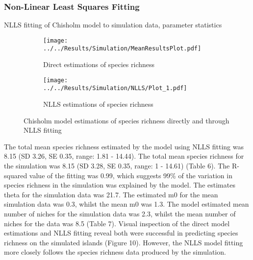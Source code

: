 \documentclass{article}
\begin{document}
\subsubsection{Non-Linear Least Squares Fitting}      
   
\begin{table}[h!]
\caption{NLLS fitting of Chisholm model to simulation data, parameter statistics}
\centering
{}
   \end{table}\bigskip

\begin{figure}
 \centering
 \begin{subfigure}[b]{0.4\linewidth}
  \texttt{[image: ../../Results/Simulation/MeanResultsPlot.pdf]}
   \caption{Direct estimations of species richness}
  \end{subfigure}
  \begin{subfigure}[b]{0.4\linewidth}
   \texttt{[image: ../../Results/Simulation/NLLS/Plot\_1.pdf]}
    \caption{NLLS estimations of species richness}
  \end{subfigure}
  \caption{Chisholm model estimations of species richness directly and through NLLS fitting}
  \label{fig:modelfitting}
\end{figure}

The total mean species richness estimated by the model using NLLS fitting was 8.15 (SD 3.26, SE 0.35, range: 1.81 - 14.44). The total mean species richness for the simulation was 8.15 (SD 3.28, SE 0.35, range: 1 - 14.61) (Table 6). The R-squared value of the fitting was 0.99, which suggests 99\% of the variation in species richness in the simulation was explained by the model. 
The estimates theta for the simulation data was 21.7. The estimated m0 for the mean simulation data was 0.3, whilst the mean m0 was 1.3. The model estimated mean number of niches for the simulation data was 2.3, whilst the mean number of niches for the data was 8.5 (Table 7).
  Visual inspection of the direct model estimations and NLLS fitting reveal both were successful in predicting species richness on the simulated islands (Figure 10). However, the NLLS model fitting more closely follows the species richness data produced by the simulation.
  
\end{document}
